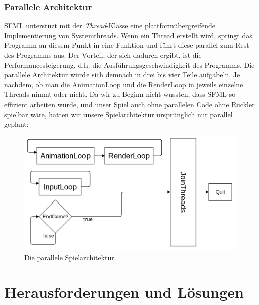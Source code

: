 \documentclass[11pt,a4paper]{scrbook}
\begin{document}
\subsection{Parallele Architektur}
SFML unterstüzt mit der \textit{Thread}-Klasse eine plattformübergreifende Implementierung
von Systemthreads. Wenn ein Thread erstellt wird, springt das Programm an diesem Punkt
in eine Funktion und führt diese parallel zum Rest des Programms aus. Der Vorteil,
der sich dadurch ergibt, ist die Performancesteigerung, d.h. die Ausführungsgeschwindigkeit des Programms. Die
parallele Architektur würde sich demnach in drei bis vier Teile aufgabeln. Je nachdem, ob man die AnimationLoop
und die RenderLoop in jeweils einzelne Threads nimmt oder nicht. Da wir zu Beginn
nicht wussten, dass SFML so effizient arbeiten würde, und unser Spiel auch ohne parallelen Code
ohne Ruckler spielbar wäre, hatten wir unsere Spielarchitektur ursprünglich nur parallel geplant:
\\
\begin{figure}[h]
\centering
\includegraphics[scale=0.3]{img/threads.png}
\caption{Die parallele Spielarchitektur}
\label{fig:parallel}
\end{figure}


\chapter{Herausforderungen und Lösungen}     
\end{document}
